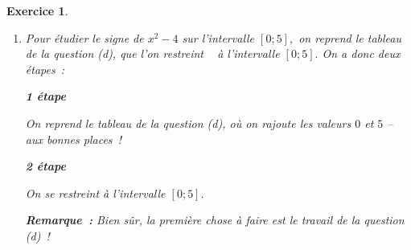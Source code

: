 \documentclass[10pt]{article}
\newtheorem{exo}{Exercice}
\begin{document}
\begin{exo}
\begin{enumerate}
\begin{enumerate}
\end{enumerate}
\item Pour étudier le signe de $x^2-4$ sur l'intervalle $\left[0;5\right],$ on reprend le tableau de la question (d), que l'on \og restreint \fg~{} à l'intervalle  $\left[0;5\right].$ On a donc deux étapes~:

\setlength{\columnseprule}{1pt}

\begin{multicols}{2}

\textbf{1 étape}

On reprend le tableau de la question (d), où on rajoute les valeurs $0$ et $5$ -- aux bonnes places~!

\begin{center}
\end{center}


\columnbreak

\textbf{2 étape}

On se restreint à l'intervalle $\left[0;5\right].$

\begin{center}
\end{center}

\end{multicols}

\medskip

\textbf{Remarque~:} Bien sûr, la première chose à faire est le travail de la question (d)~!


\end{enumerate}

\end{exo}
\end{document}

